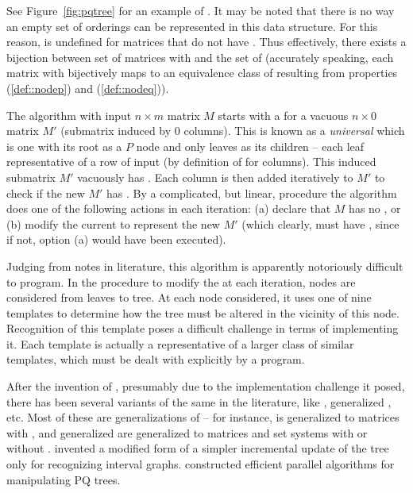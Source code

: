 See Figure~\ref{fig:pqtree} for an example of \PQtree. It may be noted
that there is no way an empty set of \COP orderings can be represented
in this data structure. For this reason, \PQtree is undefined for
matrices that do not have \COP.  Thus effectively, there exists a
bijection between set of matrices with \COP and the set of \PQtrees
(accurately speaking, each matrix with \COP bijectively maps to an
equivalence class of \PQtrees resulting from properties (\ref{def::nodep}) and
(\ref{def::nodeq})).


\figpqtree

The \cite{bl76} algorithm with input $n \times m$ matrix $M$ starts
with a \PQtree for a vacuous $n \times 0$ matrix $M'$ (submatrix
induced by 0 columns). This is known as a {\em universal} \PQtree
which is one with its root as a $P$ node and only leaves as its
children -- each leaf representative of a row of input (by definition
of \COP for columns). This induced submatrix $M'$ vacuously has \COP.
Each column is then added iteratively to $M'$ to check if the new $M'$
has \COP.  By a complicated, but linear, procedure the algorithm does
one of the following actions in each iteration: (a) declare that $M$
has no \COP, or (b) modify the current \PQtree to represent the new
$M'$ (which clearly, must have \COP, since if not, option (a) would
have been executed).


Judging from notes in literature, this algorithm is apparently
notoriously difficult to program. In the procedure to modify the
\PQtree at each iteration, nodes are considered from leaves to
tree. At each node considered, it uses one of nine templates to
determine how the tree must be altered in the vicinity of this
node. Recognition of this template poses a difficult challenge in
terms of implementing it. Each template is actually a representative
of a larger class of similar templates, which must be dealt with
explicitly by a program\cite{mcc04}.


After the invention of \PQtrees, presumably due to the implementation
challenge it posed, there has been several variants of the same in the
literature, like \PCtree \cite{sh99,wlh01,hm03}, generalized \PQtree
\cite{km89,mcc04}, \PQRtree \cite{mm96,mpt98} etc. Most of these are
generalizations of \PQtree -- for instance, \PCtree is generalized to
matrices with \CROP, \PQRtree and generalized \PQtree are generalized
to matrices and set systems with or without \COP. \cite{km89} invented
a modified form of \PQtree a simpler incremental update of the tree
only for recognizing interval graphs.  \cite{kr88} constructed
efficient parallel algorithms for manipulating PQ trees. 

